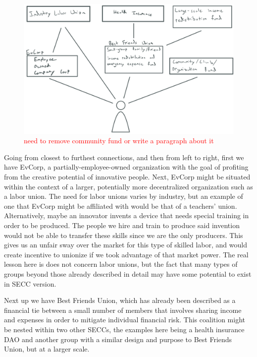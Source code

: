 \documentclass{article}[10pt]
\begin{document}
\begin{figure}[! ht]
    \centering
    \includegraphics[width=\textwidth]{figures/IMG_1537E0469B4D-1.pdf}
    \caption{\textcolor{red}{need to remove community fund or write a paragraph about it}}
    \label{fig:person_in_groups}
\end{figure}

Going from closest to furthest connections, and then from left to right, first we have EvCorp, a partially-employee-owned organization with the goal of profiting from the creative potential of innovative people. 
Next, EvCorp might be situated within the context of a larger, potentially more decentralized organization such as a labor union.
The need for labor unions varies by industry, but an example of one that EvCorp might be affiliated with would be that of a teachers' union.
Alternatively, maybe an innovator invents a device that needs special training in order to be produced.
The people we hire and train to produce said invention would not be able to transfer these skills since we are the only producers.
This gives us an unfair sway over the market for this type of skilled labor, and would create incentive to unionize if we took advantage of that market power.
The real lesson here is does not concern labor unions, but the fact that many types of groups beyond those already described in detail may have some potential to exist in SECC version.\par 

Next up we have Best Friends Union, which has already been described as a financial tie between a small number of members that involves sharing income and expenses in order to mitigate individual financial risk.
This coalition might be nested within two other SECCs, the examples here being a health insurance DAO and another group with a similar design and purpose to Best Friends Union, but at a larger scale. \par
\end{document}
